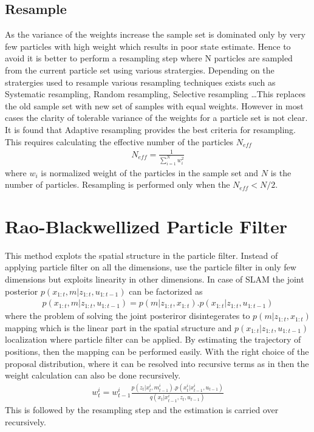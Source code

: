 \subsection{Resample}
As the variance of the weights increase the sample set is dominated only by very few particles with high weight which results in poor state estimate. Hence
to avoid it is better to perform a resampling step where N particles are sampled from the current particle set using various stratergies. Depending on the 
stratergies used to resample various resampling techniques exists such as Systematic resampling, Random resampling, Selective resampling \dots This replaces the 
old sample set with new set of samples with equal weights. However in most cases the clarity of tolerable variance of the weights for a particle set is not clear.
It is found that Adaptive resampling provides the best criteria for resampling. This requires calculating the effective number of the particles ${N_{eff}}$
\begin{gather} \label{Neff}
N_{eff} = \frac{1}{\sum_{i=1}^{N} w_{i}^{2} } 
\end{gather}
where ${w_{i}}$ is normalized weight of the particles in the sample set and ${N}$ is the number of particles.  Resampling is performed only 
when the ${N_{eff} < N/2}$.
\section{Rao-Blackwellized Particle Filter}
 This method explots the spatial structure in the particle filter. Instead of applying particle filter on all the dimensions, use the particle filter in only few dimensions
but exploits linearity in other dimensions. In case of SLAM the joint posterior $p(x_{1:t}, m | z_{1:t}, u_{1:t-1})$ can be factorized as 
\begin{gather} \label{RAoB}
    p(x_{1:t}, m | z_{1:t}, u_{1:t-1}) = p(m | z_{1:t}, x_{1:t}).p(x_{1:t} | z_{1:t}, u_{1:t-1})
\end{gather}
where the problem of solving the joint posteriror disintegerates to $p(m | z_{1:t}, x_{1:t})$ mapping which is the linear part in the spatial structure and $p(x_{1:t} | z_{1:t}, u_{1:t-1})$
localization where particle filter can be applied. By estimating the trajectory of positions, then the mapping can be performed easily. With the right choice of the proposal distribution,
where it can be resolved into recursive terms as in  then the weight calculation can also be done recursively.
\begin{gather} \label{RaoB_weight}
    w_{t}^{i} = w_{t-1}^{i} \frac{p(z_{t}|x_{t}^{i}, m_{t-1}^{i}). p(x_{t}^{i}|x_{t-1}^{i}, u_{t-1})}{q(x_t|x_{t-1}^{i},z_{t}, u_{t-1})}
\end{gather}
This is followed by the resampling step and the estimation is carried over recursively.
